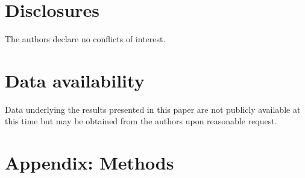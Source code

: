 \documentclass{osa-article}
\begin{document}
	\section*{Disclosures}
	
	The authors declare no conflicts of interest.
	
	\section*{Data availability}
	
	Data underlying the results presented in this paper are not publicly available at this time but may be obtained from the authors upon reasonable request.
	
	\section*{Appendix: Methods}
\end{document}
